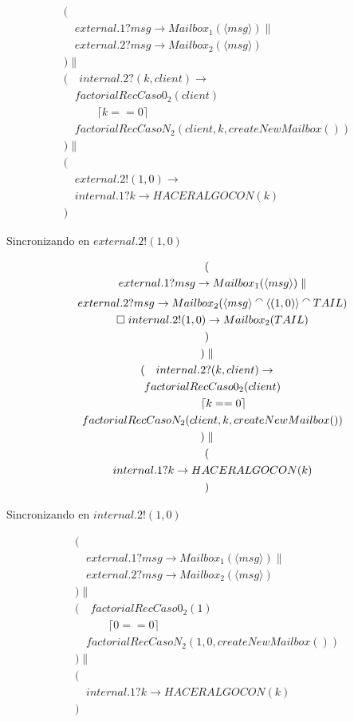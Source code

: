 \documentclass[fleqn]{article}
\newcommand{\myList}[1]{\langle #1 \rangle}
\newcommand{\myCons}[0]{\mathbin{\raise 0.8ex\hbox{$\smallfrown$}}}
\begin{document}
\begin{gather*}
( \\ 
\quad external.1?msg \rightarrow Mailbox_1(\myList{msg})  \parallel \\
\quad external.2?msg \rightarrow Mailbox_2(\myList{msg})  \\
) \parallel \\
(
\quad internal.2?(k,client) \rightarrow \\
\quad factorialRecCaso0_2(client) \\
\quad \qquad \lceil k == 0 \rceil \\
\quad factorialRecCasoN_2(client, k, createNewMailbox()) \\
) \parallel \\
( \\
\quad external.2!(1,0) \rightarrow \\
\quad internal.1?k \rightarrow HACERALGOCON(k) \\ 
)
\end{gather*}

Sincronizando en $external.2!(1, 0)$

\begin{gather*}
( \\ 
\quad external.1?msg \rightarrow Mailbox_1(\myList{msg}) \parallel  \\
\quad external.2?msg \rightarrow Mailbox_2(\myList{msg} \myCons \myList{(1,0)} \myCons TAIL) \\ 
\quad \square \; internal.2!(1,0) \rightarrow Mailbox_2(TAIL) \\  
) \\
) \parallel \\
(
\quad internal.2?(k,client) \rightarrow \\
\quad factorialRecCaso0_2(client) \\
\quad \qquad \lceil k == 0 \rceil \\
\quad factorialRecCasoN_2(client, k, createNewMailbox()) \\
) \parallel \\
( \\
\quad internal.1?k \rightarrow HACERALGOCON(k) \\ 
)
\end{gather*}

Sincronizando en $internal.2!(1,0)$

\begin{gather*}
( \\ 
\quad external.1?msg \rightarrow Mailbox_1(\myList{msg}) \parallel \\
\quad external.2?msg \rightarrow Mailbox_2(\myList{msg})  \\
) \parallel \\
(
\quad factorialRecCaso0_2(1) \\
\quad \qquad \lceil 0 == 0 \rceil \\
\quad factorialRecCasoN_2(1, 0, createNewMailbox()) \\
) \parallel \\
( \\
\quad internal.1?k \rightarrow HACERALGOCON(k) \\ 
)
\end{gather*}
\end{document}
